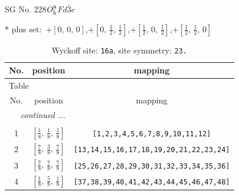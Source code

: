 \documentclass[fleqn,8pt]{jsarticle}
\begin{document}
\setcounter{MaxMatrixCols}{32}

\renewcommand{\tablename}{Table~}
\renewcommand{\figurename}{Figure~}
\begin{center}
\LARGE
SG No. 228\quad$O_{\rm h}^{8}$\quad$Fd\bar{3}c$\quad[ cubic ]
\end{center}
* plus set:\,\,\,$+\left[ 0,\, 0,\, 0 \right]$,\quad $+\left[ 0,\, \frac{1}{2},\, \frac{1}{2} \right]$,\quad $+\left[ \frac{1}{2},\, 0,\, \frac{1}{2} \right]$,\quad $+\left[ \frac{1}{2},\, \frac{1}{2},\, 0 \right]$
\renewcommand{\arraystretch}{1.2}
\begin{longtable}{ccc}
\caption{Wyckoff site: {\tt 16a}, site symmetry: {\tt 23.}}
 \\
 \hline \hline
No. & position & mapping \\ \hline \endfirsthead

\multicolumn{2}{l}{\tablename\ \thetable{}} \\
 \hline \hline
No. & position & mapping \\ \hline \endhead

 \hline \hline
\multicolumn{2}{r}{\footnotesize\it continued ...} \\ \endfoot

 \hline \hline
\multicolumn{2}{r}{} \\ \endlastfoot

1 & $\left[ \frac{1}{8},\, \frac{1}{8},\, \frac{1}{8} \right]$ & {\tt [1,2,3,4,5,6,7,8,9,10,11,12]} \\ \hline
2 & $\left[ \frac{7}{8},\, \frac{3}{8},\, \frac{7}{8} \right]$ & {\tt [13,14,15,16,17,18,19,20,21,22,23,24]} \\ \hline
3 & $\left[ \frac{7}{8},\, \frac{7}{8},\, \frac{7}{8} \right]$ & {\tt [25,26,27,28,29,30,31,32,33,34,35,36]} \\ \hline
4 & $\left[ \frac{1}{8},\, \frac{5}{8},\, \frac{1}{8} \right]$ & {\tt [37,38,39,40,41,42,43,44,45,46,47,48]} \\
\end{longtable}
\renewcommand{\arraystretch}{1.2}
\end{document}
